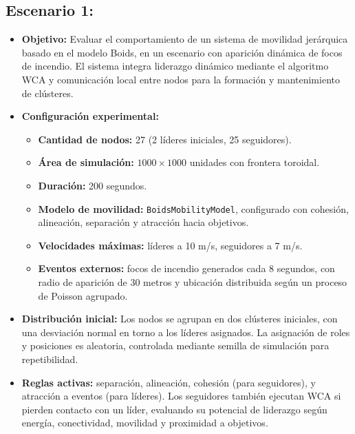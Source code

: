\documentclass{article}
\begin{document}
\subsection{Escenario 1:}
\begin{itemize}
\item \textbf{Objetivo:} Evaluar el comportamiento de un sistema de movilidad jerárquica basado en el modelo Boids, en un escenario con aparición dinámica de focos de incendio. El sistema integra liderazgo dinámico mediante el algoritmo WCA y comunicación local entre nodos para la formación y mantenimiento de clústeres.

\item \textbf{Configuración experimental:}
\begin{itemize}
    \item \textbf{Cantidad de nodos:} 27 (2 líderes iniciales, 25 seguidores).
    \item \textbf{Área de simulación:} $1000 \times 1000$ unidades con frontera toroidal.
    \item \textbf{Duración:} 200 segundos.
    \item \textbf{Modelo de movilidad:} \texttt{BoidsMobilityModel}, configurado con cohesión, alineación, separación y atracción hacia objetivos.
    \item \textbf{Velocidades máximas:} líderes a 10 m/s, seguidores a 7 m/s.
    \item \textbf{Eventos externos:} focos de incendio generados cada 8 segundos, con radio de aparición de 30 metros y ubicación distribuida según un proceso de Poisson agrupado.
\end{itemize}

\item \textbf{Distribución inicial:}
Los nodos se agrupan en dos clústeres iniciales, con una desviación normal en torno a los líderes asignados. La asignación de roles y posiciones es aleatoria, controlada mediante semilla de simulación para repetibilidad.

\item \textbf{Reglas activas:} separación, alineación, cohesión (para seguidores), y atracción a eventos (para líderes). Los seguidores también ejecutan WCA si pierden contacto con un líder, evaluando su potencial de liderazgo según energía, conectividad, movilidad y proximidad a objetivos.


\end{itemize}
\end{document}
